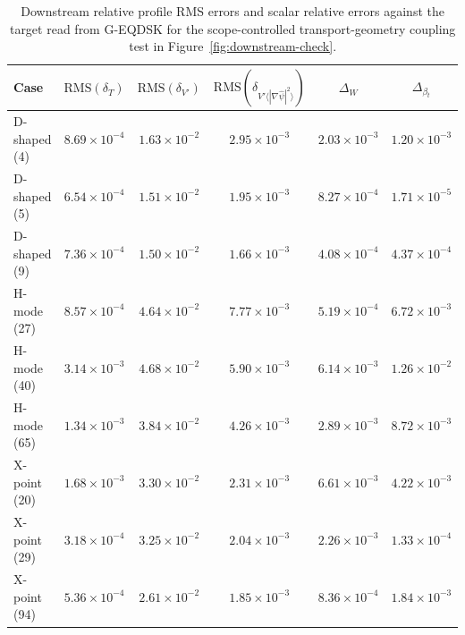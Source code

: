 \documentclass[final, 3p, times]{elsarticle}
\newcommand{\tableformat}{\centering\small}
\begin{document}
\begin{table}[tb]
    \caption{Downstream relative profile RMS errors and scalar relative errors against the target read from G-EQDSK for the scope-controlled transport-geometry coupling test in Figure~\ref{fig:downstream-check}.}
    \tableformat
    \begin{tabular}{l c c c c c}
        \hline
        Case         & \(\mathrm{RMS}(\delta_T)\) & \(\mathrm{RMS}(\delta_{V'})\) & \(\mathrm{RMS}(\delta_{V'\langle|\nabla\hat{\psi}|^2\rangle})\) & \(\Delta_W\)         & \(\Delta_{\beta_t}\) \\
        \hline
        D-shaped (4) & $8.69\times 10^{-4}$       & $1.63\times 10^{-2}$          & $2.95\times 10^{-3}$                                            & $2.03\times 10^{-3}$ & $1.20\times 10^{-3}$ \\
        D-shaped (5) & $6.54\times 10^{-4}$       & $1.51\times 10^{-2}$          & $1.95\times 10^{-3}$                                            & $8.27\times 10^{-4}$ & $1.71\times 10^{-5}$ \\
        D-shaped (9) & $7.36\times 10^{-4}$       & $1.50\times 10^{-2}$          & $1.66\times 10^{-3}$                                            & $4.08\times 10^{-4}$ & $4.37\times 10^{-4}$ \\
        H-mode (27)  & $8.57\times 10^{-4}$       & $4.64\times 10^{-2}$          & $7.77\times 10^{-3}$                                            & $5.19\times 10^{-4}$ & $6.72\times 10^{-3}$ \\
        H-mode (40)  & $3.14\times 10^{-3}$       & $4.68\times 10^{-2}$          & $5.90\times 10^{-3}$                                            & $6.14\times 10^{-3}$ & $1.26\times 10^{-2}$ \\
        H-mode (65)  & $1.34\times 10^{-3}$       & $3.84\times 10^{-2}$          & $4.26\times 10^{-3}$                                            & $2.89\times 10^{-3}$ & $8.72\times 10^{-3}$ \\
        X-point (20) & $1.68\times 10^{-3}$       & $3.30\times 10^{-2}$          & $2.31\times 10^{-3}$                                            & $6.61\times 10^{-3}$ & $4.22\times 10^{-3}$ \\
        X-point (29) & $3.18\times 10^{-4}$       & $3.25\times 10^{-2}$          & $2.04\times 10^{-3}$                                            & $2.26\times 10^{-3}$ & $1.33\times 10^{-4}$ \\
        X-point (94) & $5.36\times 10^{-4}$       & $2.61\times 10^{-2}$          & $1.85\times 10^{-3}$                                            & $8.36\times 10^{-4}$ & $1.84\times 10^{-3}$ \\
        \hline
    \end{tabular}
    \label{tab:downstream-check}
\end{table}
\end{document}

